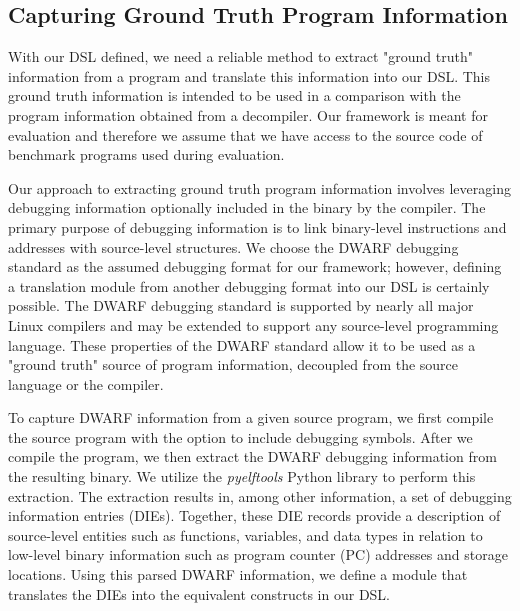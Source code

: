 \documentclass[a4paper,twoside]{article}
\begin{document}
\subsection{Capturing Ground Truth Program Information}

With our DSL defined, we need a reliable method to extract "ground truth" information from a program and translate this information into our DSL. This ground truth information is intended to be used in a comparison with the program information obtained from a decompiler. Our framework is meant for evaluation and therefore we assume that we have access to the source code of benchmark programs used during evaluation.

Our approach to extracting ground truth program information involves leveraging debugging information optionally included in the binary by the compiler. The primary purpose of debugging information is to link binary-level instructions and addresses with source-level structures. We choose the DWARF debugging standard as the assumed debugging format for our framework; however, defining a translation module from another debugging format into our DSL is certainly possible. The DWARF debugging standard is supported by nearly all major Linux compilers and may be extended to support any source-level programming language. These properties of the DWARF standard allow it to be used as a "ground truth" source of program information, decoupled from the source language or the compiler.

To capture DWARF information from a given source program, we first compile the source program with the option to include debugging symbols. After we compile the program, we then extract the DWARF debugging information from the resulting binary. We utilize the \emph{pyelftools} Python library \cite{bib:pyelftools} to perform this extraction. The extraction results in, among other information, a set of debugging information entries (DIEs). Together, these DIE records provide a description of source-level entities such as functions, variables, and data types in relation to low-level binary information such as program counter (PC) addresses and storage locations. Using this parsed DWARF information, we define a module that translates the DIEs into the equivalent constructs in our DSL.

\end{document}
